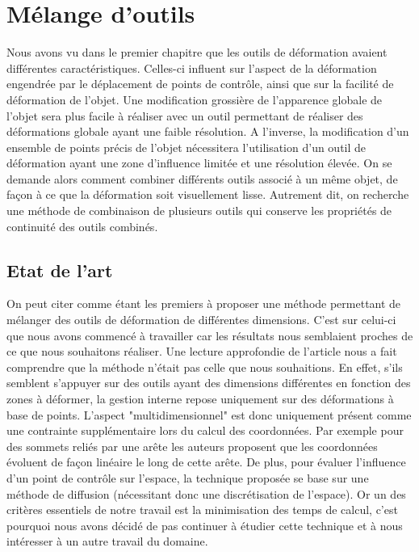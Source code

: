 

\chapter{Mélange d'outils}

\graphicspath{ {Chapter3/Chapter3Figs/PNG/}
  {Chapter3/Chapter3Figs/PDF/} {Chapter3/Chapter3Figs/} }

Nous avons vu dans le premier chapitre que les outils de déformation avaient
différentes caractéristiques. Celles-ci influent sur l'aspect de la
déformation engendrée par le déplacement de points de contrôle, ainsi que sur
la facilité de déformation de l'objet. Une modification grossière de
l'apparence globale de l'objet sera plus facile à réaliser avec un outil
permettant de réaliser des déformations globale ayant une faible résolution. A
l'inverse, la modification d'un ensemble de points précis de l'objet
nécessitera l'utilisation d'un outil de déformation ayant une zone d'influence
limitée et une résolution élevée. On se demande alors comment combiner
différents outils associé à un même objet, de façon à ce que la déformation
soit visuellement lisse. Autrement dit, on recherche une méthode de
combinaison de plusieurs outils qui conserve les propriétés de continuité des
outils combinés.

\section{Etat de l'art}

On peut citer \cite{JBPS11} comme étant les premiers à proposer une méthode
permettant de mélanger des outils de déformation de différentes dimensions.
C'est sur celui-ci que nous avons commencé à travailler car les résultats nous
semblaient proches de ce que nous souhaitons réaliser. Une lecture approfondie
de l'article nous a fait comprendre que la méthode n'était pas celle que nous
souhaitions. En effet, s'ils semblent s'appuyer sur des outils ayant des
dimensions différentes en fonction des zones à déformer, la gestion interne
repose uniquement sur des déformations à base de points. L'aspect
"multidimensionnel" est donc uniquement présent comme une contrainte
supplémentaire lors du calcul des coordonnées. Par exemple pour des sommets
reliés par une arête les auteurs proposent que les coordonnées évoluent de
façon linéaire le long de cette arête. De plus, pour évaluer l'influence d'un
point de contrôle sur l'espace, la technique proposée se base sur une méthode
de diffusion (nécessitant donc une discrétisation de l'espace). Or un des
critères essentiels de notre travail est la minimisation des temps de calcul,
c'est pourquoi nous avons décidé de pas continuer à étudier cette technique et
à nous intéresser à un autre travail du domaine.

